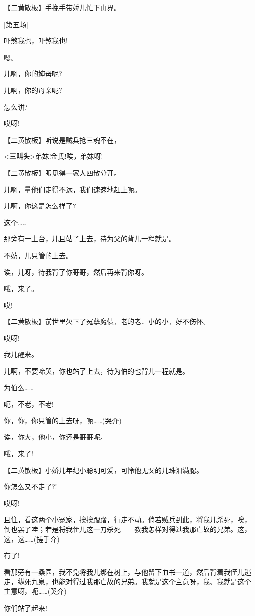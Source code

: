 【二黄散板】手挽手带娇儿忙下山界。

{[}第五场{]}

吓煞我也，吓煞我也!

嗯。

儿啊，你的婶母呢?

儿啊，你的母亲呢?

怎么讲?

哎呀!

【二黄散板】听说是贼兵抢三魂不在，

\textless{}\textbf{三叫头}\textgreater{}弟妹!金氏!唉，弟妹呀!

【二黄散板】眼见得一家人四散分开。

儿啊，量他们走得不远，我们速速地赶上呃。

儿啊，你这是怎么样了?

这个\ldots{}\ldots{}

那旁有一土台，儿且站了上去，待为父的背儿一程就是。

不妨，儿只管的上去。

诶，儿呀，待我背了你哥哥，然后再来背你呀。

哦，来了。

哎!

【二黄散板】前世里欠下了冤孽魔债，老的老、小的小，好不伤怀。

哎呀!

我儿醒来。

儿啊，不要啼哭，你也站了上去，待为伯的也背儿一程就是。

为伯么\ldots{}\ldots{}

呃，不老，不老!

你，你，你只管的上去呀，呃\ldots{}\ldots{}(哭介)

诶，你大，他小，你还是哥哥呢。

哦，来了!

【二黄散板】小娇儿年纪小聪明可爱，可怜他无父的儿珠泪满腮。

你怎么又不走了?!

哎呀!

且住，看这两个小冤家，挨挨蹭蹭，行走不动。倘若贼兵到此，将我儿杀死，唉，倒也罢了哇；若是将我侄儿这一刀杀死------教我怎样对得过我那亡故的兄弟。这，这，这\ldots{}\ldots{}(搓手介)

有了!

看那旁有一桑园，我不免将我儿绑在树上，与他留下血书一道，然后背着我侄儿逃走，纵死九泉，也能对得过我那亡故的兄弟。我就是这个主意呀，我、我就是这个主意呀，呃\ldots{}\ldots{}(哭介)

你们站了起来!

